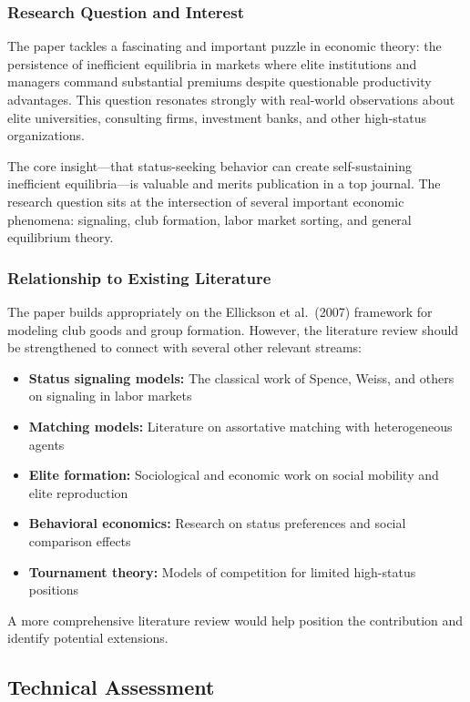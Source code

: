 \documentclass[12pt,letterpaper]{article}
\begin{document}
\subsubsection{Research Question and Interest}

The paper tackles a fascinating and important puzzle in economic theory: the persistence of inefficient equilibria in markets where elite institutions and managers command substantial premiums despite questionable productivity advantages. This question resonates strongly with real-world observations about elite universities, consulting firms, investment banks, and other high-status organizations.

The core insight---that status-seeking behavior can create self-sustaining inefficient equilibria---is valuable and merits publication in a top journal. The research question sits at the intersection of several important economic phenomena: signaling, club formation, labor market sorting, and general equilibrium theory.

\subsubsection{Relationship to Existing Literature}

The paper builds appropriately on the Ellickson et al.\ (2007) framework for modeling club goods and group formation. However, the literature review should be strengthened to connect with several other relevant streams:

\begin{itemize}
	\item \textbf{Status signaling models:} The classical work of Spence, Weiss, and others on signaling in labor markets
	\item \textbf{Matching models:} Literature on assortative matching with heterogeneous agents
	\item \textbf{Elite formation:} Sociological and economic work on social mobility and elite reproduction
	\item \textbf{Behavioral economics:} Research on status preferences and social comparison effects
	\item \textbf{Tournament theory:} Models of competition for limited high-status positions
\end{itemize}

A more comprehensive literature review would help position the contribution and identify potential extensions.

\subsection{Technical Assessment}
\end{document}
